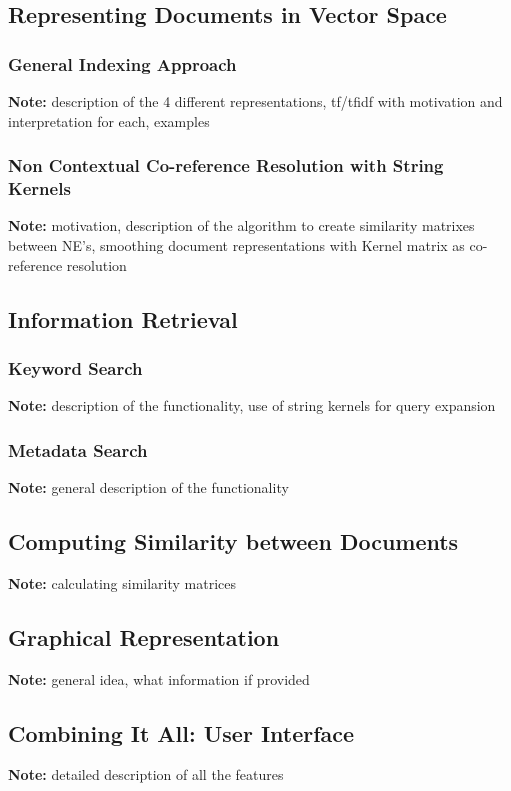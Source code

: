 \documentclass[11pt]{article}
\newcommand{\note}[1]{{\textbf{Note:} \color{blue} #1}}
\begin{document}
	\subsection {Representing Documents in Vector Space}
		\subsubsection{General Indexing Approach}
		\note description of the 4 different representations, tf/tfidf with motivation and interpretation for each, examples
  	\subsubsection {Non Contextual Co-reference Resolution with String Kernels}
  	\note motivation, description of the algorithm to create similarity matrixes between NE's, smoothing document
          representations with Kernel matrix as co-reference resolution
  		
	\subsection {Information Retrieval}
		\subsubsection{Keyword Search}
		\note description of the functionality, use of string kernels for query expansion 
		\subsubsection{Metadata Search}
		\note general description of the functionality
		
	\subsection {Computing Similarity between Documents}
  \note calculating similarity matrices
	
	\subsection {Graphical Representation}
	\note general idea, what information if provided	
	
	\subsection {Combining It All: User Interface}
	\note detailed description of all the features 
\end{document}

